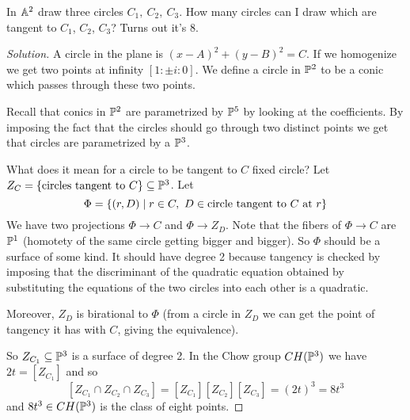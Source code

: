 \begin{exercise}
In $\mathbb{A}^2$ draw three circles $C_1,\ C_2,\ C_3$. How many circles can I draw which are tangent to $C_1$, $C_2$, $C_3$? Turns out it's 8.
\end{exercise}
\begin{proof}[Solution]
A circle in the plane is $(x-A)^2+(y-B)^2=C$. If we homogenize we get two points at infinity $[1:\pm i:0]$. We define a circle in $\mathbb{P}^2$ to be a conic which passes through these two points.

Recall that conics in $\mathbb{P}^2$ are parametrized by $\mathbb{P}^5$ by looking at the coefficients. By imposing the fact that the circles should go through two distinct points we get that circles are parametrized by a $\mathbb{P}^3$.


What does it mean for a circle to be tangent to $C$ fixed circle? Let $Z_C=\left\{{\text{circles tangent to $C$}}\right\}\subseteq\mathbb{P}^3$. Let
\[\Phi=\left\{{(r,D)\mid r\in C,\ D\in \text{circle tangent to $C$ at $r$}}\right\}\]
We have two projections $\Phi\to C$ and $\Phi\to Z_D$. Note that the fibers of $\Phi\to C$ are $\mathbb{P}^1$ (homotety of the same circle getting bigger and bigger). So $\Phi$ should be a surface of some kind. It should have degree 2 because tangency is checked by imposing that the discriminant of the quadratic equation obtained by substituting the equations of the two circles into each other is a quadratic.

Moreover, $Z_D$ is birational to $\Phi$ (from a circle in $Z_D$ we can get the point of tangency it has with $C$, giving the equivalence).

So $Z_{C_1}\subseteq\mathbb{P}^3$ is a surface of degree 2. In the Chow group $CH(\mathbb{P}^3)$ we have $2t=[Z_{C_1}]$ and so
\[[Z_{C_1}\cap Z_{C_2}\cap Z_{C_3}]=[Z_{C_1}][Z_{C_2}][Z_{C_3}]=(2t)^3=8t^3\]
and $8t^3\in CH(\mathbb{P}^3)$ is the class of eight points.
\end{proof}
















